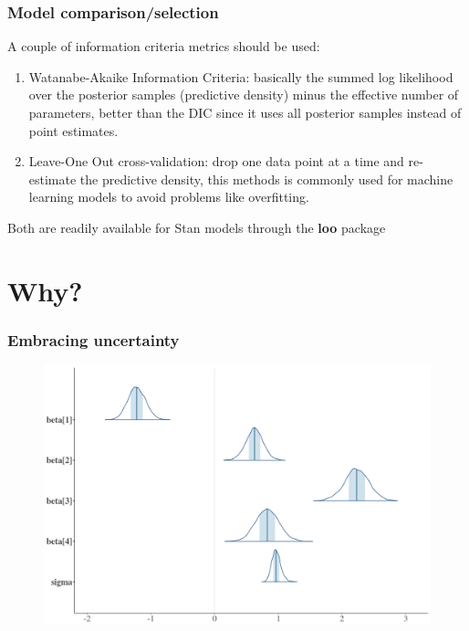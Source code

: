 \documentclass{beamer}
\begin{document}
  \begin{frame}
  \frametitle{\bf Model comparison/selection}
  
  A couple of information criteria metrics should be used:
  
  \begin{enumerate}
   \item Watanabe-Akaike Information Criteria: basically the summed log likelihood over the posterior samples (predictive density) minus the effective number of parameters, better than the DIC since it uses all posterior samples instead of point estimates.
   \item Leave-One Out cross-validation: drop one data point at a time and re-estimate the predictive density, this methods is commonly used for machine learning models to avoid problems like overfitting.
  \end{enumerate}
  
  \vspace*{0.2cm}
  
  Both are readily available for Stan models through the \textbf{loo} package

  
 \end{frame}
 

\section{Why?}
 
  \begin{frame}
  \frametitle{\bf Embracing uncertainty}
  
  \begin{figure}
   \includegraphics[width=\textwidth,height=.7\textheight,keepaspectratio]{posterior-params.png}
  \end{figure}

  
  
 \end{frame}
 
\end{document}
